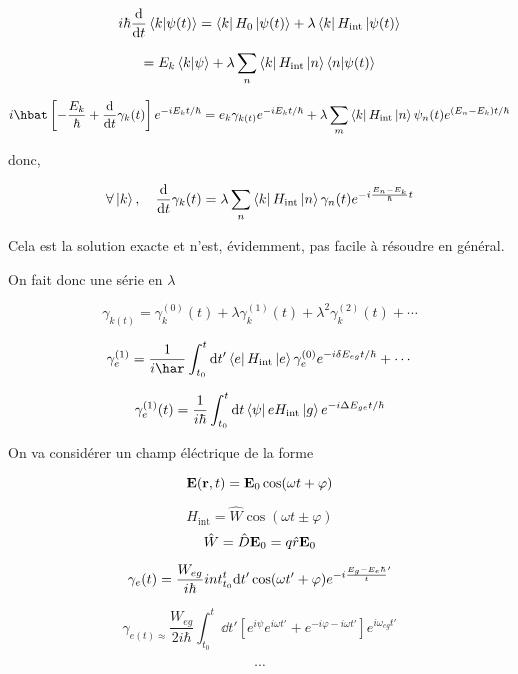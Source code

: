 $$i\hbar \dv{{}}{t} \bra{k}\ket{\psi(t)} = \bra{k}H_0 \ket{\psi(t)} + \lambda \bra{k} H_{\text{int}}\ket{\psi(t)} $$ 

$$= E_k \bra{k} \ket{\psi} + \lambda \sum_n \bra{k} H_{\text{int}} \ket{n}\bra{n}\ket{\psi(t)}$$ 

$$i\hbat \left[ - \frac{E_k}{\hbar} + \dv{{}}{t} \gamma_k (t) \right]e^{-iE_k t/\hbar} = e_k \gamma_{k(t)} e^{-i E_k t/\hbar} + \lambda \sum_m \bra{k} H_{\text{int}} \ket{n} \psi_n (t) e^{(E_n -E_k )t/\hbar} $$ 


donc,

$$\forall \ket{k},\quad \dv{{}}{t} \gamma_k (t) = \lambda \sum_n \bra{k} H_{\text{int}} \ket{n} \gamma_n (t) e^{-i \frac{E_n -E_k }{\hbar}t } $$ 

Cela est la solution exacte et n'est, évidemment, pas facile à résoudre en général.

On fait donc une série en $\lambda$ 

$$\gamma_{k(t)} = \gamma_k^{(0)}(t) +\lambda \gamma_k^{(1)}(t) + \lambda^{2}\gamma_k^{(2)}(t) + \dotsb$$ 


$$\gamma_e^{(1)} = \frac{1}{i\har} \int_{t_0}^{t}\dd t' \bra{e}H_{\text{int}}\ket{e} \gamma_e^{(0)} e^{-i \delta E_{eg} t/\hbar} + \dotsb   $$ 

$$\gamma_e^{(1)} (t) = \frac{1}{i\hbar} \int_{t_0}^{t}\dd t \bra{\psi}{e} H_{\text{int}} \ket{g} e^{-i \Delta E_{ge} t/\hbar} $$ 

On va considérer un champ éléctrique de la forme

$$\vb{E} (\vb{r},t) = \vb{E}_0 \cos(\omega t + \varphi)$$ 

$$H_{\text{int}} = \hat W \cos(\omega t \pm \varphi) $$ 
$$\hat W = \hat D \vb{E}_0 = q \hat r \vb{E}_0$$ 


$$\gamma_e (t) = \frac{W_{eg}}{i\hbar} \\int_{t_0}^{t}\dd t' \cos(\omega t' + \varphi) e^{-i \frac{E_g -E_{e}{\hbar}} t' }$$ 

$$\gamma_{e(t)\approx} \frac{W_{eg}}{2i\hbar} \int_{t_{0}}^{t} \dd t' \left[ e^{i\psi} e^{i\omega t'}+ e^{-i\varphi-i\omega t'} \right] e^{i\omega_{eg} t'} $$ 


$$\dotsb$$ 





